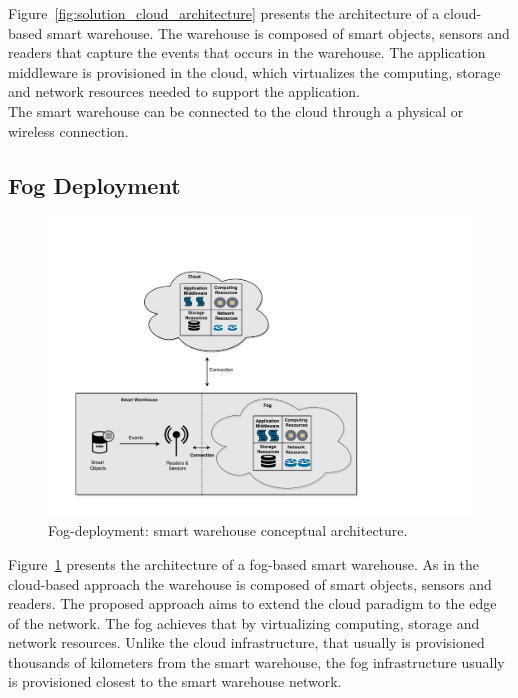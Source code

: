 Figure~\ref{fig:solution_cloud_architecture} presents the architecture of a cloud-based smart warehouse.
The warehouse is composed of smart objects, sensors and readers that capture the events that occurs
in the warehouse. The application middleware is provisioned in the cloud, which virtualizes the computing,
storage and network resources needed to support the application.\\

The smart warehouse can be connected to the cloud through a physical or wireless connection.

\subsection{Fog Deployment}
\label{sub:sol_fog}

\begin{figure}[ht!]
\centering
\includegraphics[width=\textwidth]{./images/solution_fog_architecture}
\caption[Fog-deployment: conceptual architecture.]{Fog-deployment: smart warehouse conceptual architecture.}
\label{fig:solution_fog_architecture}
\end{figure}

Figure~\ref{fig:solution_fog_architecture} presents the architecture of a fog-based smart warehouse.
As in the cloud-based approach the warehouse is composed of smart objects, sensors and readers.
The proposed approach aims to extend the cloud paradigm to the edge of the network. The fog achieves
that by virtualizing computing, storage and network resources. Unlike the cloud infrastructure, that
usually is provisioned thousands of kilometers from the smart warehouse, the fog infrastructure
usually is provisioned closest to the smart warehouse network.\\

